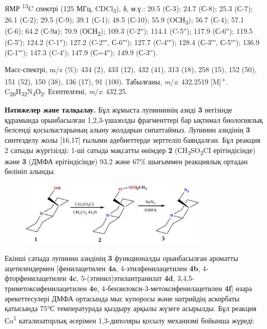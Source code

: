 ЯМР \textsuperscript{13}C спектрі (125 МГц, CDCl\textsubscript{3}), δ,
м.ү.: 20.5 (С-3); 24.7 (С-8); 25.3 (С-7); 26.1 (С-2); 29.5 (С-9); 39.1
(С-1); 48.5 (С-10); 55.9 (OСН\textsubscript{3}); 56.7 (С-4); 57.1 (С-6);
64.2 (С-9а); 70.9 (ОСН\textsubscript{2}); 109.3 (C-2ʹʹ); 114.1 (C-5ʹʹ);
117.9 (С-6ʹʹ); 119.5 (С-5ʹ); 124.2 (C-1ʹʹ); 127.2 (C-2ʹʹʹ, С-6ʹʹʹ);
127.7 (C-4ʹʹʹ); 128.4 (С-3ʹʹʹ, С-5ʹʹʹ); 136.9 (С-1ʹʹʹ); 147.3 (C-4ʹ);
147.9 (С=4ʹʹ); 149.9 (С-3ʹʹ).

Масс-спектрі, m/z (\%): 434 (2), 433 (12), 432 (41), 313 (18), 258 (15),
152 (50), 151 (52), 150 (38), 136 (17), 91 (100). Табылғаны,
\emph{m}/\emph{z}: 432.2519 {[}M{]}\textsuperscript{+}.
C\textsubscript{26}H\textsubscript{32}N\textsubscript{4}О\textsubscript{2}.
Есептелгені, \emph{m}/\emph{z}: 432.25.

\textbf{Нәтижелер және талқылау.} Бұл жұмыста лупининнің азиді
\textbf{3} негізінде құрамында орынбасылған 1,2,3-үшазолды фрагменттері
бар ықтимал биологиялық белсенді қосылыстарының алыну жолдарын
сипаттаймыз. Лупинин азидінің \textbf{3} синтезделу жолы {[}16,17{]}
ғылыми әдебиеттерде зерттеліп баяндалған. Бұл реакция 2 сатыды
жүргізілді: 1-ші сатыда мақсатты өнімдер \textbf{2}
(СH\textsubscript{3}SO\textsubscript{2}CI ерітіндісінде) және \textbf{3}
(ДМФА ерітіндісінде) 93.2 және 67\% шығыммен реакциялық ортадан бөлініп
алынды.

\begin{figure}[H]
	\centering
	\includegraphics[width=0.8\textwidth]{assets/1011}
	\caption*{}
\end{figure}

Екінші сатыда лупинин азидінің \textbf{3} функционалды орынбасылған
ароматты ацетилендермен {[}фенилацетилен \textbf{4a},
4-этилфенилацетилен \textbf{4b}, 4-фторфенилацетилен \textbf{4c},
5-(этинил)этилантранилат \textbf{4d}, 3,4,5-триметоксифенилацетилен
\textbf{4e}, 4-бензилокси-3-метоксифенилацетилен \textbf{4f}{]} өзара
әрекеттесулері ДМФА ортасында мыс купоросы және натрийдің аскорбаты
қатысында 75°С температурада қыздыру арқылы жүзеге асырылды. Бұл реакция
Сu\textsuperscript{1} катализаторлық әсерімен 1,3-диполяры қосылу
механизмі бойынша жүреді:

